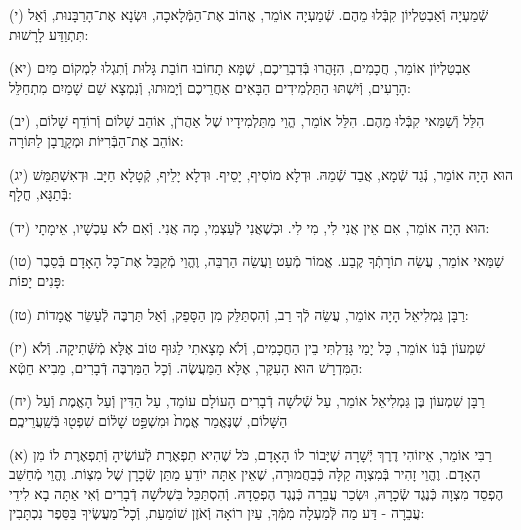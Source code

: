\documentclass[twoside, openany, parskip=half, 11pt]{book}
\begin{document}
(י) שְֿׁמַעְיָה וְֿאַבְטַלְיוֹן קִבְּֿלוּ מֵהֶם. שְֿׁמַעְיָה אוֹמֵר, אֱהוֹב אֶת־הַמְּֿלָאכָה, וּשְׂנָא אֶת־הָרַבָּנוּת, וְֿאַל תִּתְוַדַּע לָרָשׁוּת:

(יא) אַבְטַלְיוֹן אוֹמֵר, חֲכָמִים, הִזָּהֲרוּ בְּֿדִבְרֵיכֶם, שֶׁמָּא תָחוֹבוּ חוֹבַת גָּלוּת וְֿתִגְלוּ לִמְקוֹם מַיִם הָרָעִים, וְֿיִשְׁתּוּ הַתַּלְמִידִים הַבָּאִים אַחֲרֵיכֶם וְֿיָמוּתוּ, וְֿנִמְצָא שֵׁם שָׁמַיִם מִתְחַלֵּל:

(יב) הִלֵּל וְֿשַׁמַּאי קִבְּֿלוּ מֵהֶם. הִלֵּל אוֹמֵר, הֱוֵי מִתַּלְמִידָיו שֶׁל אַהֲרֹן, אוֹהֵב שָׁלוֹם וְֿרוֹדֵף שָׁלוֹם, אוֹהֵב אֶת־הַבְּֿרִיּוֹת וּמְקָרֲבָן לַתּוֹרָה:

(יג) הוּא הָיָה אוֹמֵר, נְֿגַד שְֿׁמָא, אֲבַד שְֿׁמֵהּ. וּדְלָא מוֹסִיף, יָסֵיף. וּדְלָא יָלֵיף, קְֿטָלָא חַיָּב. וּדְאִשְׁתַּמֵּשׁ בְּֿתַגָּא, חֳלָף:

(יד) הוּא הָיָה אוֹמֵר, אִם אֵין אֲנִי לִי, מִי לִי. וּכְשֶׁאֲנִי לְֿעַצְמִי, מָה אֲנִי. וְֿאִם לֹא עַכְשָׁיו, אֵימָתָי:

(טו) שַׁמַּאי אוֹמֵר, עֲשֵׂה תוֹרָתְֿךָ קֶבַע. אֱמוֹר מְֿעַט וַעֲשֵׂה הַרְבֵּה, וֶהֱוֵי מְֿקַבֵּל אֶת־כָּל הָאָדָם בְּֿסֵבֶר פָּנִים יָפוֹת:

(טז) רַבָּן גַּמְלִיאֵל הָיָה אוֹמֵר, עֲשֵׂה לְֿךָ רַב, וְֿהִסְתַּלֵּק מִן הַסָּפֵק, וְֿאַל תַּרְבֶּה לְֿעַשֵּׂר אֳמָדוֹת:

(יז) שִׁמְעוֹן בְּֿנוֹ אוֹמֵר, כָּל יָמַי גָּדַלְתִּי בֵין הַחֲכָמִים, וְֿלֹא מָצָאתִי לַגּוּף טוֹב אֶלָּא מְֿשְּֿׁתִיקָה. וְֿלֹא הַמִּדְרָשׁ הוּא הָעִקָּר, אֶלָּא הַמַּעֲשֶׂה. וְֿכׇל
הַמַּרְבֶּה דְֿבָרִים, מֵבִיא חֵטְֿא:



(יח) רַבָּן שִׁמְעוֹן בֶּן גַּמְלִיאֵל אוֹמֵר, עַל שְֿׁלשָׁה דְֿבָרִים הָעוֹלָם עוֹמֵד, עַל הַדִּין וְֿעַל הָאֱמֶת וְֿעַל הַשָּׁלוֹם, שֶׁנֶּאֱמַר אֱמֶת֙ וּמִשְׁפַּ֣ט שָׁל֔וֹם שִׁפְט֖וּ בְּֿשַֽׁעֲרֵיכֶֽם׃





\kolyisroel

(א) רַבִּי אוֹמֵר, אֵיזוֹהִי דֶרֶךְ יְֿשָׁרָה שֶׁיָּבוֹר לוֹ הָאָדָם, כֹּל שֶׁהִיא תִפְאֶרֶת לְֿעוֹשֶׂיהָ וְֿתִפְאֶרֶת לוֹ מִן הָאָדָם.
וֶהֱוֵי זָהִיר בְּֿמִצְוָה קַלָּה כְּֿבַחֲמוּרָה, שֶׁאֵין אַתָּה יוֹדֵעַ מַתַּן שְֿׂכָרָן שֶׁל מִצְוֹת. וֶהֱוֵי מְֿחַשֵּׁב הֶפְסֵד מִצְוָה כְּֿנֶגֶד שְֿׂכָרָהּ, וּשְׂכַר עֲבֵרָה כְּֿנֶגֶד הֶפְסֵדָהּ.
וְֿהִסְתַּכֵּל בִּשְׁלשָׁה דְֿבָרִים וְֿאִי אַתָּה בָא לִידֵי עֲבֵרָה - דַּע מַה לְּֿמַעְלָה מִמְּֿךָ, עַיִן רוֹאָה וְֿאֹזֶן שׁוֹמַעַת, וְֿכׇל־מַעֲשֶׂיךָ בַּסֵּפֶר נִכְתָּבִין:
\end{document}
